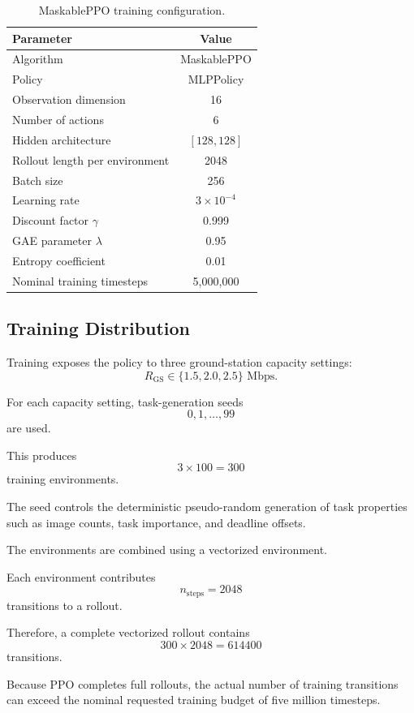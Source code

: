 \documentclass[11pt]{article}
\begin{document}
\begin{table}[h]
\centering
\begin{tabular}{lc}
\toprule
Parameter & Value \\
\midrule
Algorithm & MaskablePPO \\
Policy & MLPPolicy \\
Observation dimension & 16 \\
Number of actions & 6 \\
Hidden architecture & $[128,128]$ \\
Rollout length per environment & 2048 \\
Batch size & 256 \\
Learning rate & $3\times10^{-4}$ \\
Discount factor $\gamma$ & 0.999 \\
GAE parameter $\lambda$ & 0.95 \\
Entropy coefficient & 0.01 \\
Nominal training timesteps & 5,000,000 \\
\bottomrule
\end{tabular}
\caption{MaskablePPO training configuration.}
\label{tab:ppo-hyperparameters}
\end{table}


\subsection{Training Distribution}

Training exposes the policy to three ground-station capacity settings:
\[
R_{\mathrm{GS}}
\in
\{1.5,2.0,2.5\}
\text{ Mbps}.
\]

For each capacity setting, task-generation seeds
\[
0,1,\ldots,99
\]
are used.

This produces
\[
3\times100=300
\]
training environments.

The seed controls the deterministic pseudo-random generation of task
properties such as image counts, task importance, and deadline offsets.

The environments are combined using a vectorized environment.

Each environment contributes
\[
n_{\mathrm{steps}}=2048
\]
transitions to a rollout.

Therefore, a complete vectorized rollout contains
\[
300\times2048
=
614400
\]
transitions.

Because PPO completes full rollouts, the actual number of training
transitions can exceed the nominal requested training budget of five million
timesteps.
\end{document}
